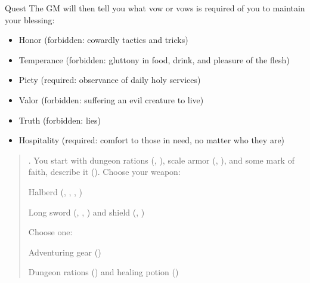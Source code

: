 \documentclass[8pt]{extarticle}
\begin{document}
\begin{minipage}[t]{4.6in}
\begin{basicmove}{Quest}
  The GM will then tell you what vow or vows is required of you to
  maintain your blessing:

  \begin{itemize}
  \item Honor (forbidden: cowardly tactics and tricks)
  \item Temperance (forbidden: gluttony in food, drink, and pleasure of the flesh)
  \item Piety (required: observance of daily holy services)
  \item Valor (forbidden: suffering an evil creature to live)
  \item Truth (forbidden: lies)
  \item Hospitality (required: comfort to those in need, no matter who they are)
  \end{itemize}

\end{basicmove}



\vfill\null
\end{minipage}
\charlower
\clearpage

\gearbanner

\begin{multicols}{2}

  \begin{quote}
    . You start with dungeon rations
    (, ), scale armor (,
    ), and some mark of faith, describe it
    (). Choose your weapon:

    \begin{choices}
    \item Halberd (, , ,
      )
    \item Long sword (, ,
      ) and shield (,
      )
    \end{choices}

  Choose one:

  \begin{choices}
  \item Adventuring gear ()
  \item Dungeon rations () and healing potion ()
  \end{choices}

\end{quote}

\ 

\columnbreak

\ 

\end{multicols}
\end{document}
